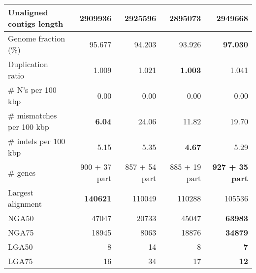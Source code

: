 \documentclass[12pt,a4paper]{article}
\begin{document}
\begin{table}[ht]
\begin{center}
\begin{tabular}{|l*{4}{|r}|}
Unaligned contigs length & 2909936 & 2925596 & {\bf 2895073} & 2949668 \\ \hline
Genome fraction (\%) & 95.677 & 94.203 & 93.926 & {\bf 97.030} \\ \hline
Duplication ratio & 1.009 & 1.021 & {\bf 1.003} & 1.041 \\ \hline
\# N's per 100 kbp & 0.00 & 0.00 & 0.00 & 0.00 \\ \hline
\# mismatches per 100 kbp & {\bf 6.04} & 24.06 & 11.82 & 19.70 \\ \hline
\# indels per 100 kbp & 5.15 & 5.35 & {\bf 4.67} & 5.29 \\ \hline
\# genes & 900 + 37 part & 857 + 54 part & 885 + 19 part & {\bf 927 + 35 part} \\ \hline
Largest alignment & {\bf 140621} & 110049 & 110288 & 105536 \\ \hline
NGA50 & 47047 & 20733 & 45047 & {\bf 63983} \\ \hline
NGA75 & 18945 & 8063 & 18876 & {\bf 34879} \\ \hline
LGA50 & 8 & 14 & 8 & {\bf 7} \\ \hline
LGA75 & 16 & 34 & 17 & {\bf 12} \\ \hline
\end{tabular}
\end{center}
\end{table}
\end{document}
